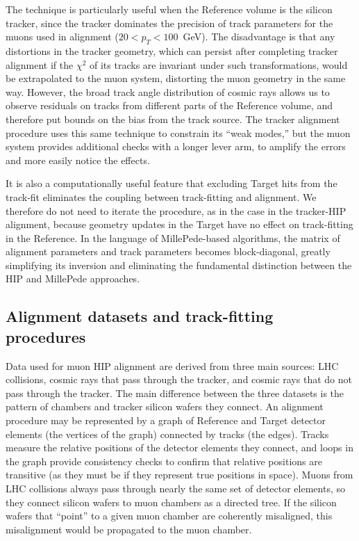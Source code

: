 \documentclass[12pt]{article}
\begin{document}
The technique is particularly useful when the Reference volume is the
silicon tracker, since the tracker dominates the precision of track
parameters for the muons used in alignment ($20 < p_T < 100$~GeV).
The disadvantage is that any distortions in the tracker geometry,
which can persist after completing tracker alignment if the $\chi^2$
of its tracks are invariant under such transformations, would be
extrapolated to the muon system, distorting the muon geometry in the
same way.  However, the broad track angle distribution of cosmic rays
allows us to observe residuals on tracks from different parts of the
Reference volume, and therefore put bounds on the bias from the track
source.  The tracker alignment procedure uses this same technique to
constrain its ``weak modes,'' but the muon system provides additional
checks with a longer lever arm, to amplify the errors and more easily
notice the effects.

It is also a computationally useful feature that excluding Target hits
from the track-fit eliminates the coupling between track-fitting and
alignment.  We therefore do not need to iterate the procedure, as in
the case in the tracker-HIP alignment, because geometry updates in the
Target have no effect on track-fitting in the Reference.  In the
language of MillePede-based algorithms, the matrix of alignment
parameters and track parameters becomes block-diagonal, greatly
simplifying its inversion and eliminating the fundamental distinction
between the HIP and MillePede approaches.

\subsection{Alignment datasets and track-fitting procedures}

Data used for muon HIP alignment are derived from three main sources:
LHC collisions, cosmic rays that pass through the tracker, and cosmic
rays that do not pass through the tracker.  The main difference
between the three datasets is the pattern of chambers and tracker
silicon wafers they connect.  An alignment procedure may be
represented by a graph of Reference and Target detector elements (the
vertices of the graph) connected by tracks (the edges).  Tracks
measure the relative positions of the detector elements they connect,
and loops in the graph provide consistency checks to confirm that
relative positions are transitive (as they must be if they represent
true positions in space).  Muons from LHC collisions always pass
through nearly the same set of detector elements, so they connect
silicon wafers to muon chambers as a directed tree.  If the silicon
wafers that ``point'' to a given muon chamber are coherently
misaligned, this misalignment would be propagated to the muon chamber.
\end{document}
